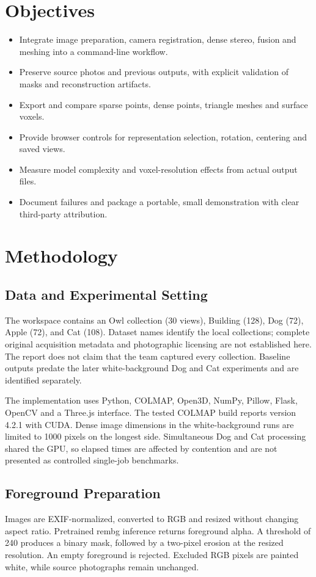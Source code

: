 \documentclass[conference]{IEEEtran}
\begin{document}
\section{Objectives}
\begin{itemize}
\item Integrate image preparation, camera registration, dense stereo, fusion and meshing into a command-line workflow.
\item Preserve source photos and previous outputs, with explicit validation of masks and reconstruction artifacts.
\item Export and compare sparse points, dense points, triangle meshes and surface voxels.
\item Provide browser controls for representation selection, rotation, centering and saved views.
\item Measure model complexity and voxel-resolution effects from actual output files.
\item Document failures and package a portable, small demonstration with clear third-party attribution.
\end{itemize}

\section{Methodology}
\subsection{Data and Experimental Setting}
The workspace contains an Owl collection (30 views), Building (128), Dog (72), Apple (72), and Cat (108). Dataset names identify the local collections; complete original acquisition metadata and photographic licensing are not established here. The report does not claim that the team captured every collection. Baseline outputs predate the later white-background Dog and Cat experiments and are identified separately.

The implementation uses Python, COLMAP, Open3D, NumPy, Pillow, Flask, OpenCV and a Three.js interface. The tested COLMAP build reports version 4.2.1 with CUDA. Dense image dimensions in the white-background runs are limited to 1000 pixels on the longest side. Simultaneous Dog and Cat processing shared the GPU, so elapsed times are affected by contention and are not presented as controlled single-job benchmarks.

\subsection{Foreground Preparation}
Images are EXIF-normalized, converted to RGB and resized without changing aspect ratio. Pretrained rembg inference returns foreground alpha. A threshold of 240 produces a binary mask, followed by a two-pixel erosion at the resized resolution. An empty foreground is rejected. Excluded RGB pixels are painted white, while source photographs remain unchanged.
\end{document}
